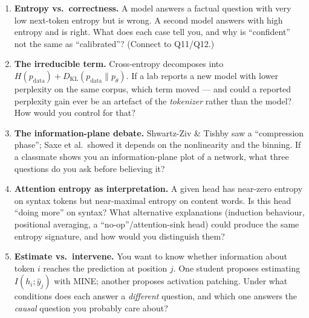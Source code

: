 \documentclass[11pt,letterpaper]{article}
\begin{document}

\begin{enumerate}[leftmargin=*,itemsep=0.6em]
\item \textbf{Entropy vs.\ correctness.} A model answers a factual question with
very low next-token entropy but is wrong. A second model answers with high entropy
and is right. What does each case tell you, and why is ``confident'' not the same
as ``calibrated''? (Connect to Q11/Q12.)

\item \textbf{The irreducible term.} Cross-entropy decomposes into
$H(p_\text{data}) + D_\text{KL}(p_\text{data}\|p_\theta)$. If a lab reports a new
model with lower perplexity on the same corpus, which term moved --- and could a
reported perplexity gain ever be an artefact of the \emph{tokenizer} rather than
the model? How would you control for that?

\item \textbf{The information-plane debate.} Shwartz-Ziv \& Tishby saw a
``compression phase''; Saxe et al.\ showed it depends on the nonlinearity and the
binning. If a classmate shows you an information-plane plot of a network, what
three questions do you ask before believing it?

\item \textbf{Attention entropy as interpretation.} A given head has near-zero
entropy on syntax tokens but near-maximal entropy on content words. Is this head
``doing more'' on syntax? What alternative explanations (induction behaviour,
positional averaging, a ``no-op''/attention-sink head) could produce the same
entropy signature, and how would you distinguish them?

\item \textbf{Estimate vs.\ intervene.} You want to know whether information about
token $i$ reaches the prediction at position $j$. One student proposes estimating
$I(h_i; \hat y_j)$ with MINE; another proposes activation patching. Under what
conditions does each answer a \emph{different} question, and which one answers the
\emph{causal} question you probably care about?
\end{enumerate}
\end{document}
